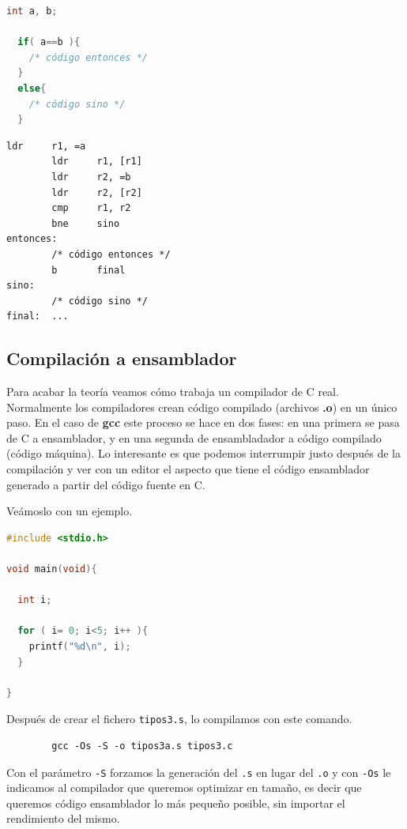 \begin{lstlisting}[caption={Estructura if en C (tipos2.c)},label={lst:codigoPract2_3},language=C]
  int a, b;

  if( a==b ){ 
    /* código entonces */
  }
  else{
    /* código sino */
  }
\end{lstlisting}

\begin{lstlisting}[caption={Traducción de la estructura {\tt if}},label={lst:codigoPract2_4}]
        ldr     r1, =a
        ldr     r1, [r1]
        ldr     r2, =b
        ldr     r2, [r2]
        cmp     r1, r2
        bne     sino
entonces:
        /* código entonces */
        b       final
sino:
        /* código sino */
final:  ...
\end{lstlisting}

\subsection{Compilación a ensamblador}

Para acabar la teoría veamos cómo trabaja un compilador de C real. Normalmente
los compiladores crean código compilado (archivos {\bf .o}) en un
único paso. En el caso de {\bf gcc} este proceso se hace en dos fases: en una
primera se pasa de C a ensamblador, y en una segunda de ensambladador a código
compilado (código máquina). Lo interesante es que podemos interrumpir justo
después de la compilación y ver con un editor el aspecto que tiene el código
ensamblador generado a partir del código fuente en C.

Veámoslo con un ejemplo.

\begin{lstlisting}[caption={Código del programa tipos3.c},label={lst:codigoPract2_5},language=C]
#include <stdio.h>

void main(void){

  int i;

  for ( i= 0; i<5; i++ ){
    printf("%d\n", i);
  }

}
\end{lstlisting}

Después de crear el fichero {\tt tipos3.s}, lo compilamos con este comando.

\begin{lstlisting}
        gcc -Os -S -o tipos3a.s tipos3.c
\end{lstlisting}

Con el parámetro {\tt -S} forzamos la generación del {\tt .s} en lugar del
{\tt .o} y con {\tt -Os} le indicamos al compilador que queremos optimizar en
tamaño, es decir que queremos código ensamblador lo más pequeño posible, sin
importar el rendimiento del mismo.

